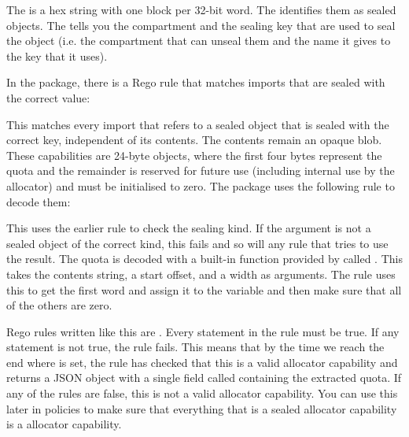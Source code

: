 {\begin{jsonsnippet}
{
  "contents": "00040000 00000000 00000000 00000000 00000000 00000000",
  "kind": "SealedObject",
  "sealing_type": {
    "compartment": "allocator",
    "key": "MallocKey",
    "provided_by": "build/cheriot/cheriot/release/cheriot.allocator.compartment",
    "symbol": "__export.sealing_type.allocator.MallocKey"
  \}
\}
\end{jsonsnippet}

The  is a hex string with one block per 32-bit word.
The  identifies them as sealed objects.
The  tells you the compartment and the sealing key that are used to seal the object (i.e. the compartment that can unseal them and the name it gives to the key that it uses).

In the  package, there is a Rego rule that matches imports that are sealed with the correct value:

\regolisting[filename=examples/auditing-rtos/rtos.rego,marker=isallocator,label=lst:isallocatorrego,caption="The Rego rule for matching objects sealed as allocator capabilities"]{}

This matches every import that refers to a sealed object that is sealed with the correct key, independent of its contents.
The contents remain an opaque blob.
These capabilities are 24-byte objects, where the first four bytes represent the quota and the remainder is reserved for future use (including internal use by the allocator) and must be initialised to zero.
The  package uses the following rule to decode them:

\regolisting[filename=examples/auditing-rtos/rtos.rego,marker=decodeallocator,label=lst:decodeallocatorrego,caption="The Rego rule for decoding allocator capabilities"]{}

This uses the earlier rule to check the sealing kind.
If the argument is not a sealed object of the correct kind, this fails and so will any rule that tries to use the result.
The quota is decoded with a built-in function provided by  called .
This takes the contents string, a start offset, and a width as arguments.
The rule uses this to get the first word and assign it to the  variable and then make sure that all of the others are zero.

Rego rules written like this are .
Every statement in the rule must be true.
If any statement is not true, the rule fails.
This means that by the time we reach the end where  is set, the rule has checked that this is a valid allocator capability and returns a JSON object with a single field called  containing the extracted quota.
If any of the rules are false, this is not a valid allocator capability.
You can use this later in policies to make sure that everything that is a sealed allocator capability is a  allocator capability.

}
